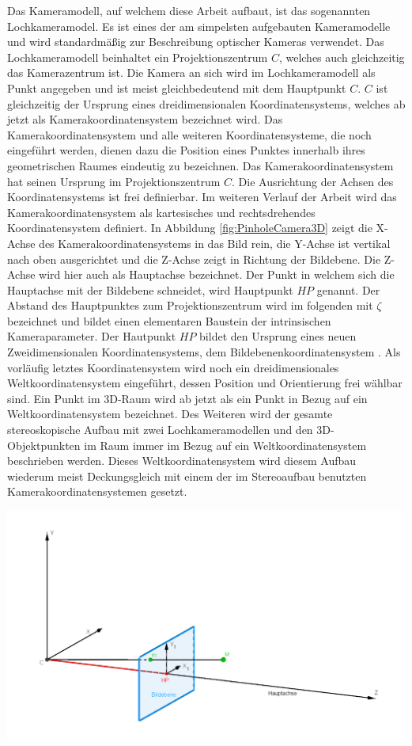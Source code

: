 Das Kameramodell, auf welchem diese Arbeit aufbaut, ist das sogenannten Lochkameramodel. Es ist eines der am simpelsten aufgebauten Kameramodelle und wird standardmäßig zur Beschreibung optischer Kameras verwendet. Das Lochkameramodell beinhaltet ein Projektionszentrum $C$, welches auch gleichzeitig das Kamerazentrum ist. Die Kamera an sich wird im Lochkameramodell als Punkt angegeben und ist meist gleichbedeutend mit dem Hauptpunkt $C$. $C$ ist gleichzeitig der Ursprung eines dreidimensionalen Koordinatensystems, welches ab jetzt als Kamerakoordinatensystem bezeichnet wird. Das Kamerakoordinatensystem und alle weiteren Koordinatensysteme, die noch eingeführt werden, dienen dazu die Position eines Punktes innerhalb ihres geometrischen Raumes eindeutig zu bezeichnen. Das Kamerakoordinatensystem hat seinen Ursprung im Projektionszentrum $C$. Die Ausrichtung der Achsen des Koordinatensystems ist frei definierbar. Im weiteren Verlauf der Arbeit wird das Kamerakoordinatensystem als kartesisches und rechtsdrehendes Koordinatensystem definiert. In Abbildung \ref{fig:PinholeCamera3D} zeigt die X-Achse des Kamerakoordinatensystems in das Bild rein, die Y-Achse ist vertikal nach oben ausgerichtet und die Z-Achse zeigt in Richtung der Bildebene. Die Z-Achse wird hier auch als Hauptachse bezeichnet. Der Punkt in welchem sich die Hauptachse mit der Bildebene schneidet, wird Hauptpunkt $HP$ genannt. Der Abstand des Hauptpunktes zum Projektionszentrum wird im folgenden mit $\zeta$ bezeichnet und bildet einen elementaren Baustein der intrinsischen Kameraparameter. Der Hautpunkt $HP$ bildet den Ursprung eines neuen Zweidimensionalen Koordinatensystems, dem Bildebenenkoordinatensystem \cite{HZ}. Als vorläufig letztes Koordinatensystem wird noch ein dreidimensionales Weltkoordinatensystem eingeführt, dessen Position und Orientierung frei wählbar sind. Ein Punkt im 3D-Raum wird ab jetzt als ein Punkt in Bezug auf ein Weltkoordinatensystem bezeichnet. Des Weiteren wird der gesamte stereoskopische Aufbau mit zwei Lochkameramodellen und den 3D-Objektpunkten im Raum immer im Bezug auf ein Weltkoordinatensystem beschrieben werden. Dieses Weltkoordinatensystem wird diesem Aufbau wiederum meist Deckungsgleich mit einem der im Stereoaufbau benutzten Kamerakoordinatensystemen gesetzt.


	\begin{minipage}{\linewidth}
	\centering
	\includegraphics[width=.8\linewidth]{images/PinholeCameraModell3D.png}
	\label{fig:PinholeCamera3D}
\end{minipage}

